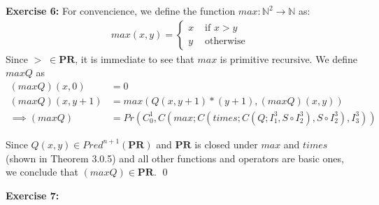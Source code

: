 \documentclass [11pt]{article}
\newcommand{\PR}{\textbf{PR}}
\begin{document}
\bigskip
\noindent
\textbf{Exercise 6:}
For convencience, we define the function $max: \mathbb{N}^2 \rightarrow \mathbb{N}$ as:
\begin{align*}
max(x,y) = \begin{cases}
           x & \text{ if } x > y \\
           y & \text{ otherwise }
           \end{cases}
\end{align*}
Since $>\; \in \PR$, it is immediate to see that $max$ is primitive recursive.
We define $maxQ$ as
\begin{align*}
(maxQ)(x,0) &= 0 \\
(maxQ)(x,y+1) &= max(Q(x,y+1) * (y+1), (maxQ)(x,y)) \\
\implies (maxQ) &= Pr(C^1_0, C(max; C(times; C(Q; I^3_1, S \circ I^3_2), S \circ I^3_2) , I^3_3))
\end{align*}

Since $Q(x,y) \in Pred^{n+1}(\PR)$ and $\PR$ is closed under $max$ and $times$ (shown in Theorem 3.0.5) and all other functions and operators are basic ones, we conclude that $(maxQ) \in \PR$.
\qed

\bigskip
\noindent
\textbf{Exercise 7:}

 
\end{document}
